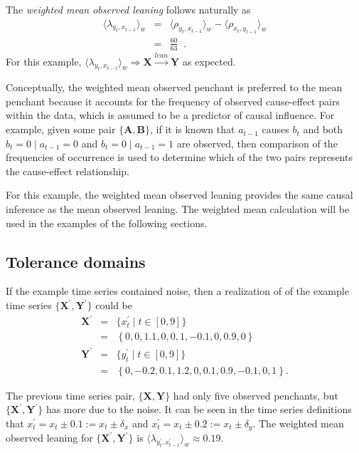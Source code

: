 \documentclass[twocolumn,aps,pre,groupedaddress]{revtex4-1}
\begin{document}
The {\em weighted mean observed leaning} follows naturally as
\begin{eqnarray*}
\langle \lambda_{y_t,x_{t-1}} \rangle_w &=& \langle \rho_{y_t,x_{t-1}} \rangle_w - \langle \rho_{x_t,y_{t-1}} \rangle_w\\
&=& \frac{60}{63}\;\;.
\end{eqnarray*}
For this example, $\langle \lambda_{y_t,x_{t-1}} \rangle_w\Rightarrow \mathbf{X}\xrightarrow{lean}\mathbf{Y}$ as expected.

Conceptually, the weighted mean observed penchant is preferred to the mean penchant because it accounts for the frequency of observed cause-effect pairs within the data, which is assumed to be a predictor of causal influence.  For example, given some pair $\{\mathbf{A},\mathbf{B}\}$, if it is known that $a_{t-1}$ causes $b_{t}$ and both $b_t = 0\; |\; a_{t-1} = 0$ and $b_t = 0\; |\; a_{t-1} = 1$ are observed, then comparison of the frequencies of occurrence is used to determine which of the two pairs represents the cause-effect relationship.

For this example, the weighted mean observed leaning provides the same causal inference as the mean observed leaning.  The weighted mean calculation will be used in the examples of the following sections.

\subsection{Tolerance domains}
\label{sec:tol}
If the example time series contained noise, then a realization of of the example time series $\{\mathbf{X}^\prime,\mathbf{Y}^\prime\}$ could be
\begin{eqnarray*}
\mathbf{X}^\prime &=& \{x_t^\prime\; | \; t\in[0,9]\}\\
&=& \left\{0,0,1.1,0,0,1,-0.1,0,0.9,0\right\}\\
\mathbf{Y}^\prime &=& \{y_t^\prime\; | \; t\in[0,9]\}\\
&=& \left\{0,-0.2,0.1,1.2,0,0.1,0.9,-0.1,0,1\right\}.
\end{eqnarray*}

The previous time series pair, $\{\mathbf{X},\mathbf{Y}\}$ had only five observed penchants, but $\{\mathbf{X}^\prime,\mathbf{Y}^\prime\}$ has more due to the noise.  It can be seen in the time series definitions that $x_t^\prime = x_t \pm 0.1 := x_t \pm \delta_x$ and $x_t^\prime = x_t \pm 0.2 := x_t \pm \delta_y$.  The weighted mean observed leaning for $\{\mathbf{X}^\prime,\mathbf{Y}^\prime\}$ is $\langle \lambda_{y_t^\prime,x_{t-1}^\prime} \rangle_w \approx 0.19$. 
\end{document}
